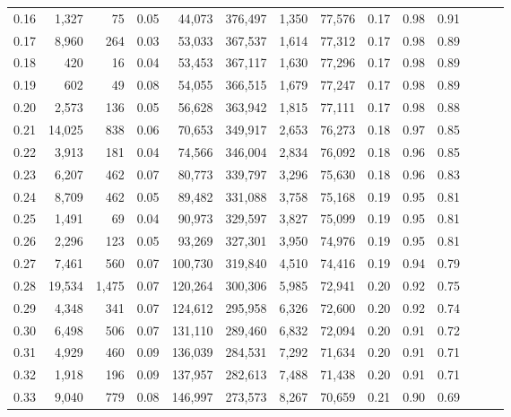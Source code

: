 \begin{tabular}{rrrrrrrrrrrrrr}
0.16 &   1,327 &     75 &  0.05 &   44,073 &  376,497 &   1,350 &  77,576 &  0.17 &  0.98 &      0.91 \\
0.17 &   8,960 &    264 &  0.03 &   53,033 &  367,537 &   1,614 &  77,312 &  0.17 &  0.98 &      0.89 \\
0.18 &     420 &     16 &  0.04 &   53,453 &  367,117 &   1,630 &  77,296 &  0.17 &  0.98 &      0.89 \\
0.19 &     602 &     49 &  0.08 &   54,055 &  366,515 &   1,679 &  77,247 &  0.17 &  0.98 &      0.89 \\
0.20 &   2,573 &    136 &  0.05 &   56,628 &  363,942 &   1,815 &  77,111 &  0.17 &  0.98 &      0.88 \\
0.21 &  14,025 &    838 &  0.06 &   70,653 &  349,917 &   2,653 &  76,273 &  0.18 &  0.97 &      0.85 \\
0.22 &   3,913 &    181 &  0.04 &   74,566 &  346,004 &   2,834 &  76,092 &  0.18 &  0.96 &      0.85 \\
0.23 &   6,207 &    462 &  0.07 &   80,773 &  339,797 &   3,296 &  75,630 &  0.18 &  0.96 &      0.83 \\
0.24 &   8,709 &    462 &  0.05 &   89,482 &  331,088 &   3,758 &  75,168 &  0.19 &  0.95 &      0.81 \\
0.25 &   1,491 &     69 &  0.04 &   90,973 &  329,597 &   3,827 &  75,099 &  0.19 &  0.95 &      0.81 \\
0.26 &   2,296 &    123 &  0.05 &   93,269 &  327,301 &   3,950 &  74,976 &  0.19 &  0.95 &      0.81 \\
0.27 &   7,461 &    560 &  0.07 &  100,730 &  319,840 &   4,510 &  74,416 &  0.19 &  0.94 &      0.79 \\
0.28 &  19,534 &  1,475 &  0.07 &  120,264 &  300,306 &   5,985 &  72,941 &  0.20 &  0.92 &      0.75 \\
0.29 &   4,348 &    341 &  0.07 &  124,612 &  295,958 &   6,326 &  72,600 &  0.20 &  0.92 &      0.74 \\
0.30 &   6,498 &    506 &  0.07 &  131,110 &  289,460 &   6,832 &  72,094 &  0.20 &  0.91 &      0.72 \\
0.31 &   4,929 &    460 &  0.09 &  136,039 &  284,531 &   7,292 &  71,634 &  0.20 &  0.91 &      0.71 \\
0.32 &   1,918 &    196 &  0.09 &  137,957 &  282,613 &   7,488 &  71,438 &  0.20 &  0.91 &      0.71 \\
0.33 &   9,040 &    779 &  0.08 &  146,997 &  273,573 &   8,267 &  70,659 &  0.21 &  0.90 &      0.69 \\

\end{tabular}
